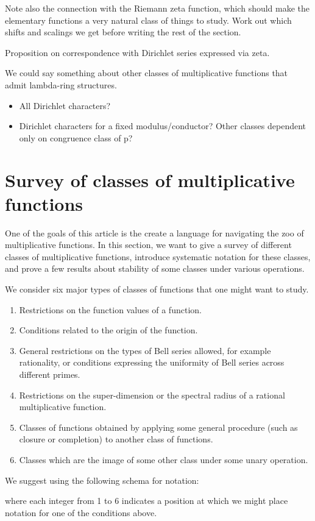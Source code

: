 \documentclass[a4paper]{article}
\begin{document}
Note also the connection with the Riemann zeta function, which should make the elementary functions a very natural class of things to study. Work out which shifts and scalings we get before writing the rest of the section.




Proposition on correspondence with Dirichlet series expressed via zeta.

We could say something about other classes of multiplicative functions that admit lambda-ring structures.  
\begin{itemize}
\item All Dirichlet characters?
\item Dirichlet characters for a fixed modulus/conductor? Other classes dependent only on congruence class of p?
\end{itemize}




\section{Survey of classes of multiplicative functions}

One of the goals of this article is the create a language for navigating the zoo of multiplicative functions. In this section, we want to give a survey of different classes of multiplicative functions, introduce systematic notation for these classes, and prove a few results about stability of some classes under various operations.

We consider six major types of classes of functions that one might want to study.

\begin{enumerate}
\item Restrictions on the function values of a function.
\item Conditions related to the origin of the function.
\item General restrictions on the types of Bell series allowed, for example rationality, or conditions expressing the uniformity of Bell series across different primes.
\item Restrictions on the super-dimension or the spectral radius of a rational multiplicative function.
\item Classes of functions obtained by applying some general procedure (such as closure or completion) to another class of functions.
\item Classes which are the image of some other class under some unary operation.
\end{enumerate}
We suggest using the following schema for notation:
\begin{center}
\end{center}
where each integer from 1 to 6 indicates a position at which we might place notation for one of the conditions above. 
\end{document}
